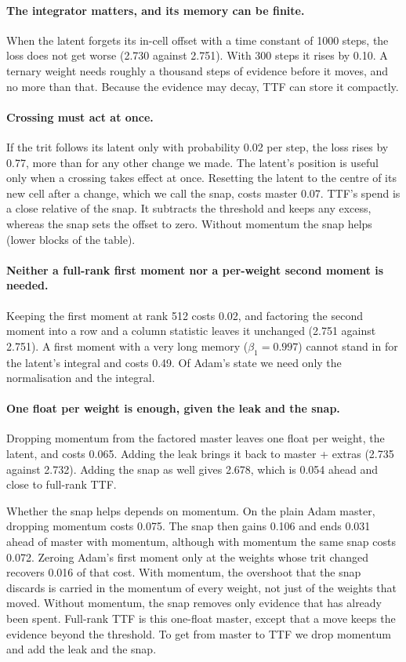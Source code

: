 \documentclass[10pt,twocolumn]{article}
\begin{document}
\paragraph{The integrator matters, and its memory can be finite.} When the latent forgets its in-cell offset with a time
constant of 1000 steps, the loss does not get worse (2.730 against 2.751). With 300 steps it rises by 0.10. A ternary
weight needs roughly a thousand steps of evidence before it moves, and no more than that. Because the evidence may
decay, TTF can store it compactly.

\paragraph{Crossing must act at once.} If the trit follows its latent only with probability 0.02 per step, the loss rises
by 0.77, more than for any other change we made. The latent's position is useful only when a crossing takes effect at
once. Resetting the latent to the centre of its new cell after a change, which we call the snap, costs master 0.07.
TTF's spend is a close relative of the snap. It subtracts the threshold and keeps any excess, whereas the snap sets the
offset to zero. Without momentum the snap helps (lower blocks of the table).

\paragraph{Neither a full-rank first moment nor a per-weight second moment is needed.} Keeping the first moment at rank
512 costs 0.02, and factoring the second moment into a row and a column statistic leaves it unchanged (2.751 against 2.751). A first moment with a
very long memory ($\beta_1=0.997$) cannot stand in for the latent's integral and costs 0.49. Of Adam's state we need only
the normalisation and the integral.

\paragraph{One float per weight is enough, given the leak and the snap.} Dropping momentum from the factored master
leaves one float per weight, the latent, and costs 0.065. Adding the leak brings it back to master + extras (2.735
against 2.732). Adding the snap as well gives 2.678, which is 0.054 ahead and close to full-rank TTF.

Whether the snap helps depends on momentum. On the plain Adam master, dropping momentum costs 0.075. The snap then gains
0.106 and ends 0.031 ahead of master with momentum, although with momentum the same snap costs 0.072. Zeroing Adam's
first moment only at the weights whose trit changed recovers 0.016 of that cost. With momentum, the overshoot that the
snap discards is carried in the momentum of every weight, not just of the weights that moved. Without momentum, the
snap removes only evidence that has already been spent. Full-rank TTF is this one-float master, except that a move keeps
the evidence beyond the threshold. To get from master to TTF we drop momentum and add the leak and the snap.
\end{document}
